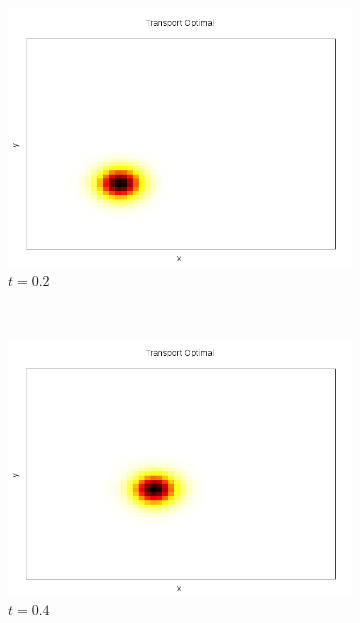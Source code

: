 \documentclass{beamer}
\begin{document}
\begin{frame}
\begin{figure}[!h]
	\begin{subfigure}[b]{0.22\linewidth}
	\includegraphics[width=\textwidth]{img/2DGaussian/C_00010.png}
	\caption{$t=0.2$}
	\end{subfigure}
	~
	\begin{subfigure}[b]{0.22\linewidth}
	\includegraphics[width=\textwidth]{img/2DGaussian/C_00020.png}
	\caption{$t=0.4$}
	\end{subfigure}
	~
	\begin{subfigure}[b]{0.22\linewidth}

\end{subfigure}
\end{figure}
\end{frame}
\end{document}
